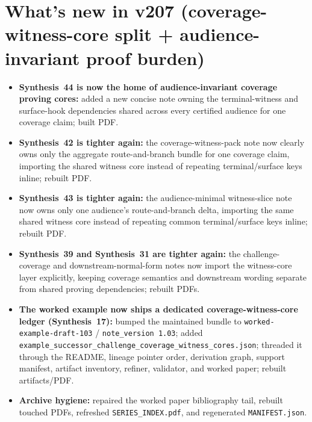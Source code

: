 \documentclass[11pt]{article}
\begin{document}
\section{What's new in v207 (coverage-witness-core split + audience-invariant proof burden)}
\begin{itemize}[leftmargin=*]
\item \textbf{Synthesis~44 is now the home of audience-invariant coverage proving cores:} added a new concise note owning the terminal-witness and surface-hook dependencies shared across every certified audience for one coverage claim; built PDF.
\item \textbf{Synthesis~42 is tighter again:} the coverage-witness-pack note now clearly owns only the aggregate route-and-branch bundle for one coverage claim, importing the shared witness core instead of repeating terminal/surface keys inline; rebuilt PDF.
\item \textbf{Synthesis~43 is tighter again:} the audience-minimal witness-slice note now owns only one audience's route-and-branch delta, importing the same shared witness core instead of repeating common terminal/surface keys inline; rebuilt PDF.
\item \textbf{Synthesis~39 and Synthesis~31 are tighter again:} the challenge-coverage and downstream-normal-form notes now import the witness-core layer explicitly, keeping coverage semantics and downstream wording separate from shared proving dependencies; rebuilt PDFs.
\item \textbf{The worked example now ships a dedicated coverage-witness-core ledger (Synthesis~17):} bumped the maintained bundle to \texttt{worked-example-draft-103} / \texttt{note\_version 1.03}; added \texttt{example\_successor\_challenge\_coverage\_witness\_cores.json}; threaded it through the README, lineage pointer order, derivation graph, support manifest, artifact inventory, refiner, validator, and worked paper; rebuilt artifacts/PDF.
\item \textbf{Archive hygiene:} repaired the worked paper bibliography tail, rebuilt touched PDFs, refreshed \texttt{SERIES\_INDEX.pdf}, and regenerated \texttt{MANIFEST.json}.
\end{itemize}
\end{document}
